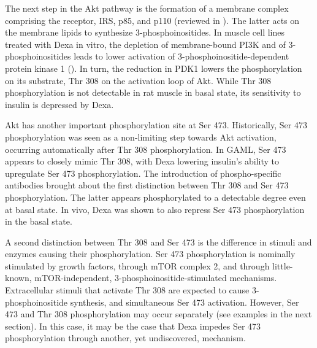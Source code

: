 \documentclass[12pt,english]{report}\usepackage[]{graphicx}\usepackage[]{color}
\begin{document}
The next step in the Akt pathway is the formation of a membrane complex
comprising the receptor, IRS, p85, and p110 (reviewed in \citep{geering2007regulation}).
The latter acts on the membrane lipids to synthesize 3-phosphoinositides.
In muscle cell lines treated with Dexa in vitro, the depletion of
membrane-bound PI3K and of 3-phosphoinositides leads to lower activation
of 3-phosphoinositide-dependent protein kinase 1 ().
In turn, the reduction in PDK1 lowers the phosphorylation on its substrate,
Thr 308 on the activation loop of Akt. While Thr 308 phosphorylation
is not detectable in rat muscle in basal state, its sensitivity to
insulin is depressed by Dexa\citep{buren2008insulin}.

Akt has another important phosphorylation site at Ser 473. Historically,
Ser 473 phosphorylation was seen as a non-limiting step towards Akt
activation, occurring automatically after Thr 308 phosphorylation.
In GAML, Ser 473 appears to closely mimic Thr 308, with Dexa lowering
insulin's ability to upregulate Ser 473 phosphorylation\citep{buren2008insulin,rojas2003regulation,williams2012dietary,watson2012cell-autonomous}.
The introduction of phospho-specific antibodies brought about the
first distinction between Thr 308 and Ser 473 phosphorylation. The
latter appears phosphorylated to a detectable degree even at basal
state. In vivo, Dexa was shown to also repress Ser 473 phosphorylation
in the basal state\citep{fappi2014effects,schakman2008role,cho2010time}.

A second distinction between Thr 308 and Ser 473 is the difference
in stimuli and enzymes causing their phosphorylation. Ser 473 phosphorylation
is nominally stimulated by growth factors, through mTOR complex 2,
and through little-known, mTOR-independent, 3-phosphoinositide-stimulated
mechanisms\citep{sarbassov2005phosphorylation}. Extracellular stimuli
that activate Thr 308 are expected to cause 3-phosphoinositide synthesis,
and simultaneous Ser 473 activation. However, Ser 473 and Thr 308
phosphorylation may occur separately (see examples in the next section).
In this case, it may be the case that Dexa impedes Ser 473 phosphorylation
through another, yet undiscovered, mechanism.
\end{document}
